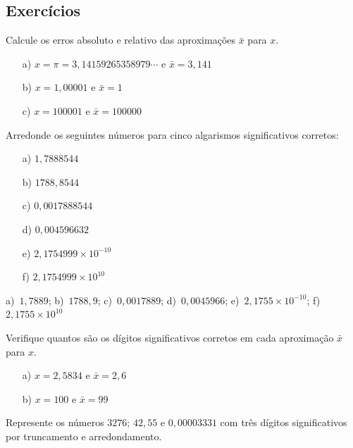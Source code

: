 \subsection*{Exercícios}

\begin{exer} Calcule os erros absoluto e relativo das aproximações $\bar{x}$ para $x$.
  \begin{itemize}
  \item[a)] $x=\pi=3,14159265358979\cdots$ e $\bar{x}=3,141$
  \item[b)] $x=1,00001$ e $\bar{x}=1$
  \item[c)] $x=100001$ e $\bar{x}=100000$
  \end{itemize}
\end{exer}


\begin{exer} Arredonde os seguintes números para cinco algarismos significativos corretos:
  \begin{multicols}{3}
    \begin{itemize}
    \item [a)] $1,7888544$
    \item [b)] $1788,8544$
    \item [c)] $0,0017888544$
    \item [d)] $0,004596632$
    \item [e)] $ 2,1754999\times 10^{-10}$
    \item [f)] $ 2,1754999\times 10^{10}$
    \end{itemize}
  \end{multicols}
\end{exer}
\begin{resp}
  
a)~$1,7889$; b)~$1788,9$; c)~$0,0017889$; d)~$0,0045966$; e)~$2,1755\times 10^{-10}$; f)~$2,1755\times 10^{10}$    
  
\end{resp}

\begin{exer}
Verifique quantos são os dígitos significativos corretos em cada aproximação $\bar{x}$ para $x$.
\begin{itemize}
\item[a)] $x=2,5834$ e $\bar{x}=2,6$
\item[b)] $x=100$ e $\bar{x}=99$
\end{itemize}
\end{exer}

\begin{exer}  Represente os números $3276$; $42,55$ e $0,00003331$ com três dígitos significativos por truncamento e arredondamento.
\end{exer}

